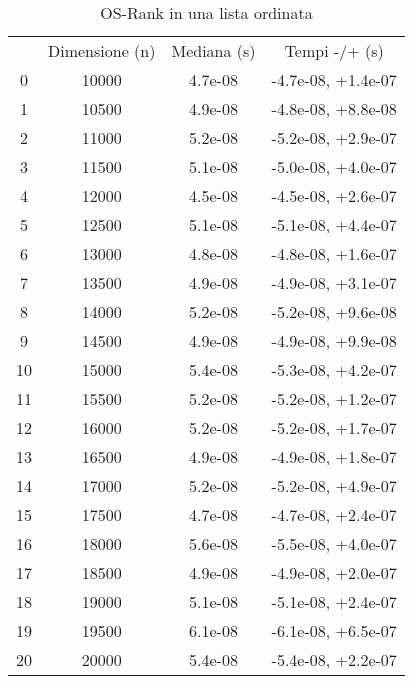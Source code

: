 \begin{table}
\centering
\caption{OS-Rank in una lista ordinata}
\label{OS-Rank in una lista ordinata}
\begin{adjustbox}{width=1\textwidth/2}
\begin{tabular}{|c|c|c|c|}
\hline
 & Dimensione (n) & Mediana (s) & Tempi -/+ (s) \\
0 & 10000 & 4.7e-08 & -4.7e-08, +1.4e-07 \\
\cline{1-4}
1 & 10500 & 4.9e-08 & -4.8e-08, +8.8e-08 \\
\cline{1-4}
2 & 11000 & 5.2e-08 & -5.2e-08, +2.9e-07 \\
\cline{1-4}
3 & 11500 & 5.1e-08 & -5.0e-08, +4.0e-07 \\
\cline{1-4}
4 & 12000 & 4.5e-08 & -4.5e-08, +2.6e-07 \\
\cline{1-4}
5 & 12500 & 5.1e-08 & -5.1e-08, +4.4e-07 \\
\cline{1-4}
6 & 13000 & 4.8e-08 & -4.8e-08, +1.6e-07 \\
\cline{1-4}
7 & 13500 & 4.9e-08 & -4.9e-08, +3.1e-07 \\
\cline{1-4}
8 & 14000 & 5.2e-08 & -5.2e-08, +9.6e-08 \\
\cline{1-4}
9 & 14500 & 4.9e-08 & -4.9e-08, +9.9e-08 \\
\cline{1-4}
10 & 15000 & 5.4e-08 & -5.3e-08, +4.2e-07 \\
\cline{1-4}
11 & 15500 & 5.2e-08 & -5.2e-08, +1.2e-07 \\
\cline{1-4}
12 & 16000 & 5.2e-08 & -5.2e-08, +1.7e-07 \\
\cline{1-4}
13 & 16500 & 4.9e-08 & -4.9e-08, +1.8e-07 \\
\cline{1-4}
14 & 17000 & 5.2e-08 & -5.2e-08, +4.9e-07 \\
\cline{1-4}
15 & 17500 & 4.7e-08 & -4.7e-08, +2.4e-07 \\
\cline{1-4}
16 & 18000 & 5.6e-08 & -5.5e-08, +4.0e-07 \\
\cline{1-4}
17 & 18500 & 4.9e-08 & -4.9e-08, +2.0e-07 \\
\cline{1-4}
18 & 19000 & 5.1e-08 & -5.1e-08, +2.4e-07 \\
\cline{1-4}
19 & 19500 & 6.1e-08 & -6.1e-08, +6.5e-07 \\
\cline{1-4}
20 & 20000 & 5.4e-08 & -5.4e-08, +2.2e-07 \\
\cline{1-4}
\end{tabular}
\end{adjustbox}
\end{table}
